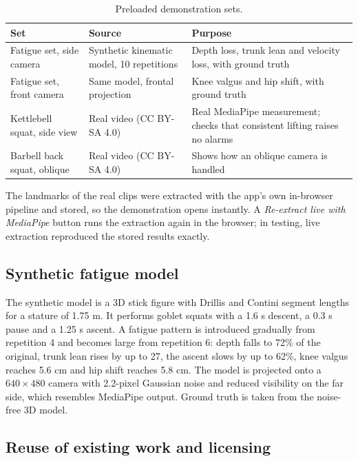 \documentclass[12pt]{article}
\begin{document}
\begin{table}[!htbp]
\centering
\caption{Preloaded demonstration sets.}
\label{tab:demo}
\small
\begin{tabularx}{\textwidth}{>{\raggedright\arraybackslash}p{4.2cm} >{\raggedright\arraybackslash}p{4.6cm} L}
\toprule
\textbf{Set} & \textbf{Source} & \textbf{Purpose} \\
\midrule
Fatigue set, side camera & Synthetic kinematic model, 10 repetitions & Depth loss, trunk lean and velocity loss, with ground truth \\
Fatigue set, front camera & Same model, frontal projection & Knee valgus and hip shift, with ground truth \\
Kettlebell squat, side view & Real video (CC BY-SA 4.0) & Real MediaPipe measurement; checks that consistent lifting raises no alarms \\
Barbell back squat, oblique & Real video (CC BY-SA 4.0) & Shows how an oblique camera is handled \\
\bottomrule
\end{tabularx}
\end{table}

The landmarks of the real clips were extracted with the app's own in-browser pipeline and stored, so the demonstration opens instantly. A \emph{Re-extract live with MediaPipe} button runs the extraction again in the browser; in testing, live extraction reproduced the stored results exactly.

\subsection{Synthetic fatigue model}

The synthetic model is a 3D stick figure with Drillis and Contini segment lengths for a stature of 1.75 m. It performs goblet squats with a 1.6 s descent, a 0.3 s pause and a 1.25 s ascent. A fatigue pattern is introduced gradually from repetition 4 and becomes large from repetition 6: depth falls to 72\% of the original, trunk lean rises by up to 27\degree, the ascent slows by up to 62\%, knee valgus reaches 5.6 cm and hip shift reaches 5.8 cm. The model is projected onto a $640 \times 480$ camera with 2.2-pixel Gaussian noise and reduced visibility on the far side, which resembles MediaPipe output. Ground truth is taken from the noise-free 3D model.

\subsection{Reuse of existing work and licensing}
\end{document}
